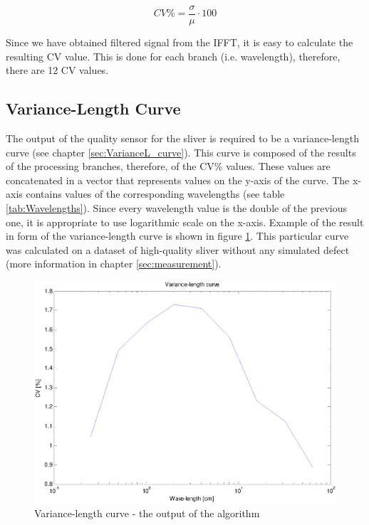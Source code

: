 \documentclass[twoside]{ctuthesis}
\theoremstyle{plain}
\theoremstyle{definition}
\theoremstyle{note}
\begin{document}
\begin{equation} \label{eq:CVCalculation}
	CV\% = \frac{\sigma}{\mu} \cdot 100
\end{equation}

Since we have obtained filtered signal from the IFFT, it is easy to calculate the resulting CV value. This is done for each branch (i.e. wavelength), therefore, there are 12 CV values.

\subsection{Variance-Length Curve}
The output of the quality sensor for the sliver is required to be a variance-length curve (see chapter \ref{sec:VarianceL_curve}). This curve is composed of the results of the processing branches, therefore, of the CV\% values. These values are concatenated in a vector that represents values on the y-axis of the curve. The x-axis contains values of the corresponding wavelengths (see table \ref{tab:Wavelengths}). Since every wavelength value is the double of the previous one, it is appropriate to use logarithmic scale on the x-axis. Example of the result in form of the variance-length curve is shown in figure \ref{fig:VLC_example11}. This particular curve was calculated on a dataset of high-quality sliver without any simulated defect (more information in chapter \ref{sec:measurement}). 

\begin{figure}[h]
	\centering
	\includegraphics[width=1.0\textwidth]{full_VLC_11.eps}
	\caption{Variance-length curve - the output of the algorithm}
	\label{fig:VLC_example11}
\end{figure}
\end{document}
